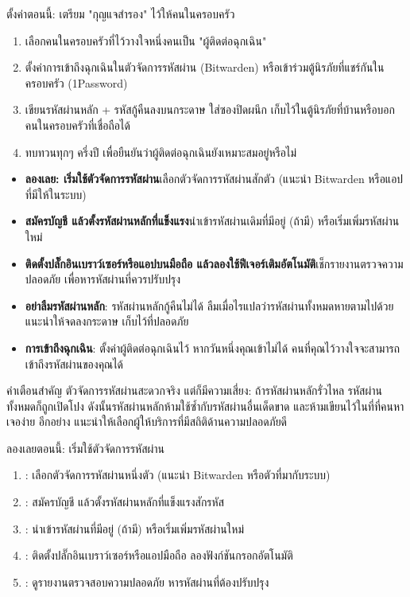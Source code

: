 \begin{tcbpractice}{ตั้งค่าตอนนี้: เตรียม "กุญแจสำรอง" ไว้ให้คนในครอบครัว}
\begin{enumerate}
  \item เลือกคนในครอบครัวที่ไว้วางใจหนึ่งคนเป็น "ผู้ติดต่อฉุกเฉิน"
  \item ตั้งค่าการเข้าถึงฉุกเฉินในตัวจัดการรหัสผ่าน (Bitwarden) หรือเข้าร่วมตู้นิรภัยที่แชร์กันในครอบครัว (1Password)
  \item เขียนรหัสผ่านหลัก + รหัสกู้คืนลงบนกระดาษ ใส่ซองปิดผนึก เก็บไว้ในตู้นิรภัยที่บ้านหรือบอกคนในครอบครัวที่เชื่อถือได้
  \item ทบทวนทุกๆ ครึ่งปี เพื่อยืนยันว่าผู้ติดต่อฉุกเฉินยังเหมาะสมอยู่หรือไม่
\end{enumerate}

\end{tcbpractice}


\begin{itemize}
  \item \textbf{ลองเลย: เริ่มใช้ตัวจัดการรหัสผ่าน}เลือกตัวจัดการรหัสผ่านสักตัว (แนะนำ Bitwarden หรือแอปที่มีให้ในระบบ)
  \item \textbf{สมัครบัญชี แล้วตั้งรหัสผ่านหลักที่แข็งแรง}นำเข้ารหัสผ่านเดิมที่มีอยู่ (ถ้ามี) หรือเริ่มเพิ่มรหัสผ่านใหม่
  \item \textbf{ติดตั้งปลั๊กอินเบราว์เซอร์หรือแอปบนมือถือ แล้วลองใช้ฟีเจอร์เติมอัตโนมัติ}เช็กรายงานตรวจความปลอดภัย เพื่อหารหัสผ่านที่ควรปรับปรุง
  \item \textbf{อย่าลืมรหัสผ่านหลัก}: รหัสผ่านหลักกู้คืนไม่ได้ ลืมเมื่อไรแปลว่ารหัสผ่านทั้งหมดหายตามไปด้วย แนะนำให้จดลงกระดาษ เก็บไว้ที่ปลอดภัย
  \item \textbf{การเข้าถึงฉุกเฉิน}: ตั้งค่าผู้ติดต่อฉุกเฉินไว้ หากวันหนึ่งคุณเข้าไม่ได้ คนที่คุณไว้วางใจจะสามารถเข้าถึงรหัสผ่านของคุณได้
\end{itemize}

\begin{tcbwarn}{คำเตือนสำคัญ}
ตัวจัดการรหัสผ่านสะดวกจริง แต่ก็มีความเสี่ยง: ถ้ารหัสผ่านหลักรั่วไหล รหัสผ่านทั้งหมดก็ถูกเปิดโปง ดังนั้นรหัสผ่านหลักห้ามใช้ซ้ำกับรหัสผ่านอื่นเด็ดขาด และห้ามเขียนไว้ในที่ที่คนหาเจอง่าย อีกอย่าง แนะนำให้เลือกผู้ให้บริการที่มีสถิติด้านความปลอดภัยดี

\end{tcbwarn}

\begin{tcbpractice}{ลองเลยตอนนี้: เริ่มใช้ตัวจัดการรหัสผ่าน}
\begin{enumerate}
  \item : เลือกตัวจัดการรหัสผ่านหนึ่งตัว (แนะนำ Bitwarden หรือตัวที่มากับระบบ)
  \item : สมัครบัญชี แล้วตั้งรหัสผ่านหลักที่แข็งแรงสักรหัส
  \item : นำเข้ารหัสผ่านที่มีอยู่ (ถ้ามี) หรือเริ่มเพิ่มรหัสผ่านใหม่
  \item : ติดตั้งปลั๊กอินเบราว์เซอร์หรือแอปมือถือ ลองฟังก์ชันกรอกอัตโนมัติ
  \item : ดูรายงานตรวจสอบความปลอดภัย หารหัสผ่านที่ต้องปรับปรุง
\end{enumerate}

\end{tcbpractice}

